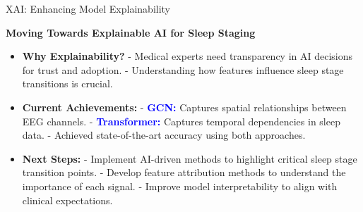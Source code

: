 
\begin{frame}{XAI: Enhancing Model Explainability}

    \textbf{Moving Towards Explainable AI for Sleep Staging}
    \vspace{0.5cm}
    
    \begin{itemize}
        \item \textbf{Why Explainability?}  
              - Medical experts need transparency in AI decisions for trust and adoption.  
              - Understanding how features influence sleep stage transitions is crucial.
              
        \item \textbf{Current Achievements:}  
              - \textcolor{blue}{\textbf{GCN:}} Captures spatial relationships between EEG channels.  
              - \textcolor{blue}{\textbf{Transformer:}} Captures temporal dependencies in sleep data.  
              - Achieved state-of-the-art accuracy using both approaches.
              
        \item \textbf{Next Steps:}  
              - Implement AI-driven methods to highlight critical sleep stage transition points.  
              - Develop feature attribution methods to understand the importance of each signal.  
              - Improve model interpretability to align with clinical expectations.
    \end{itemize}

\end{frame}



